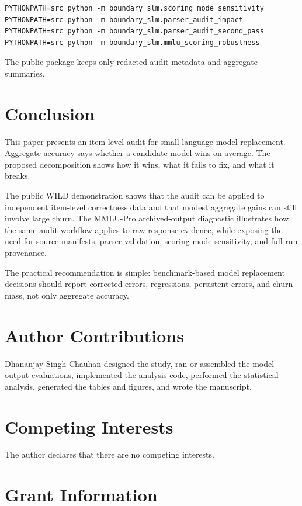 \documentclass[manuscript, screen, review, nonacm]{jair}
\begin{document}
\begin{verbatim}
PYTHONPATH=src python -m boundary_slm.scoring_mode_sensitivity
PYTHONPATH=src python -m boundary_slm.parser_audit_impact
PYTHONPATH=src python -m boundary_slm.parser_audit_second_pass
PYTHONPATH=src python -m boundary_slm.mmlu_scoring_robustness
\end{verbatim}

The public package keeps only redacted audit metadata and aggregate summaries.

\section{Conclusion}

This paper presents an item-level audit for small language model replacement. Aggregate accuracy says whether a candidate model wins on average. The proposed decomposition shows how it wins, what it fails to fix, and what it breaks.

The public WILD demonstration shows that the audit can be applied to independent item-level correctness data and that modest aggregate gains can still involve large churn. The MMLU-Pro archived-output diagnostic illustrates how the same audit workflow applies to raw-response evidence, while exposing the need for source manifests, parser validation, scoring-mode sensitivity, and full run provenance.

The practical recommendation is simple: benchmark-based model replacement decisions should report corrected errors, regressions, persistent errors, and churn mass, not only aggregate accuracy.

\section{Author Contributions}

Dhananjay Singh Chauhan designed the study, ran or assembled the model-output evaluations, implemented the analysis code, performed the statistical analysis, generated the tables and figures, and wrote the manuscript.

\section{Competing Interests}

The author declares that there are no competing interests.

\section{Grant Information}
\end{document}

